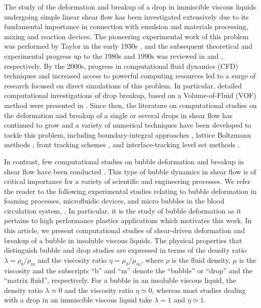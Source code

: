 \documentclass[%
 reprint,
 showkeys,
 amsmath,amssymb,
 aps,
 prfluids,
 onecolumn
]{revtex4-2}
\begin{document}
%
%
The study of the deformation and breakup of a drop in immiscible viscous
liquids undergoing simple linear shear flow has been investigated extensively
due to its fundamental importance in connection with emulsion and materials
processing, mixing and reaction devices. The pioneering experimental work
of this problem was performed by Taylor in the early 1930s \cite{Tay32, Tay34},
and the subsequent theoretical and experimental progress up to the 1980s and
1990s was reviewed in \cite{Ral84} and \cite{Sto94}, respectively.  By the
2000s, progress in computational fluid dynamics (CFD) techniques and increased
access to powerful computing resources led to a surge of research focused on
direct simulations of this problem.  In particular, detailed computational
investigations of drop breakup, 
based on a Volume-of-Fluid (VOF) method \cite{HirNic81} were
presented in \cite{LiRenRen00, RenCri01-1, RenCri01-2, RenCriLi02,
KhiRenCri03,Ren06,Ren07,Ren08-2}.  Since then, the literature on computational
studies on the deformation and breakup of a single or several drops in shear
flow has continued to grow \cite{CriGuiAlfBlaLoe03, InaTomOgi03,ZhaMikBan06,
BazAndMei06, JanAnd08, CroGriSch10,KomShaEskDer14,KomShaEskDer15, IoaLiuZha16,
HerRan17,AmaBalCasOli19, ZhaShuGuaYan21} and a variety of numerical techniques
have been developed to tackle this problem, including boundary-integral
approaches \cite{CriBlaLoe01, JanAnd07}, lattice Boltzmann methods \cite{Ina06,
KomShaEskDer14}, front tracking schemes \cite{UnvTry92}, and interface-tracking
level set methods \cite{SusSmeOsh94}.  

In contrast, few computational studies on bubble deformation and breakup in
shear flow have been conducted \cite{WanShiZha15}.  This type of bubble
dynamics in shear flow is of critical importance for a variety of
scientific and engineering processes. We refer the reader to the 
following experimental studies relating to bubble deformation in foaming
processes, microfluidic devices, and micro bubbles in the blood 
circulation system,
\cite{CHU2019108,muller2008single,bento2018deformation,drenckhan2015science}.
In particular, it is the study of bubble deformation as it pertains
to high performance plastics applications which motivates this work.  
In this article, we present
computational studies of shear-driven deformation and breakup of a bubble in
insoluble viscous liquids.  The physical properties that distinguish bubble and
drop studies are expressed in terms of the density ratio $\lambda = \rho_b /
\rho_m$ and the viscosity ratio $\eta = \mu_b / \mu_m$, where $\rho$ is the
fluid density, $\mu$ is the viscosity and the subscripts ``b'' and ``m'' denote
the ``bubble'' or ``drop'' and the ``matrix fluid'', respectively.  For a
bubble in an insoluble viscous liquid, the density ratio $\lambda \simeq 0$ and
the viscosity ratio $\eta \simeq 0$, whereas most studies dealing with a drop
in an immiscible viscous liquid take $\lambda =1$ and $\eta \simeq 1$.  
\end{document}
